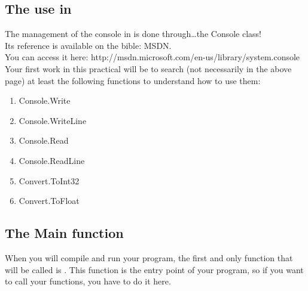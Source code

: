 \subsection{The use in \csharp}
The management of the console in \csharp is done through\ldots the Console class!\\
Its reference is available on the \csharp bible: MSDN.\\
You can access it here:
http://msdn.microsoft.com/en-us/library/system.console\\
Your first work in this practical will be to search (not necessarily in the above page)
at least the following functions to understand how to use them:

\begin{enumerate}
    \item Console.Write
    \item Console.WriteLine
    \item Console.Read
    \item Console.ReadLine
    \item Convert.ToInt32
    \item Convert.ToFloat
\end{enumerate}

\subsection{The Main function}
When you will compile and run your program, the first and only function that will be called is .
This function is the entry point of your program, so if you want to call your functions, you have to do it here.

\newpage
